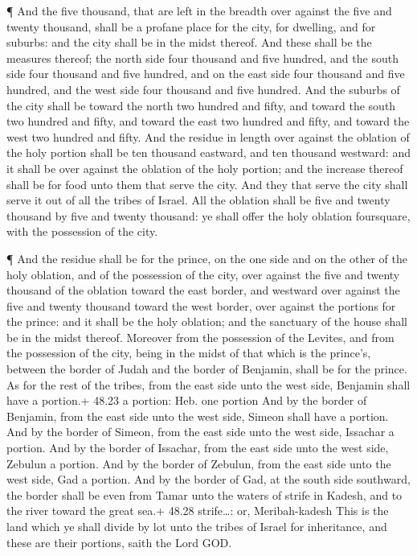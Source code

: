  ¶ And the five thousand, that are left in the breadth over
against the five and twenty thousand, shall be a profane place for the
city, for dwelling, and for suburbs: and the city shall be in the midst
thereof.  And these shall be the measures thereof; the
north side four thousand and five hundred, and the south side four
thousand and five hundred, and on the east side four thousand and five
hundred, and the west side four thousand and five hundred. 
And the suburbs of the city shall be toward the north two hundred and
fifty, and toward the south two hundred and fifty, and toward the east
two hundred and fifty, and toward the west two hundred and fifty.
 And the residue in length over against the oblation of the
holy portion shall be ten thousand eastward, and ten thousand westward:
and it shall be over against the oblation of the holy portion; and the
increase thereof shall be for food unto them that serve the city.
 And they that serve the city shall serve it out of all the
tribes of Israel.  All the oblation shall be five and
twenty thousand by five and twenty thousand: ye shall offer the holy
oblation foursquare, with the possession of the city.

 ¶ And the residue shall be for the prince, on the one side
and on the other of the holy oblation, and of the possession of the
city, over against the five and twenty thousand of the oblation toward
the east border, and westward over against the five and twenty thousand
toward the west border, over against the portions for the prince: and it
shall be the holy oblation; and the sanctuary of the house shall be in
the midst thereof.  Moreover from the possession of the
Levites, and from the possession of the city, being in the midst of that
which is the prince's, between the border of Judah and the border of
Benjamin, shall be for the prince.  As for the rest of the
tribes, from the east side unto the west side, Benjamin shall have a
portion.+ 48.23 a portion: Heb. one portion  And by the
border of Benjamin, from the east side unto the west side, Simeon shall
have a portion.  And by the border of Simeon, from the east
side unto the west side, Issachar a portion.  And by the
border of Issachar, from the east side unto the west side, Zebulun a
portion.  And by the border of Zebulun, from the east side
unto the west side, Gad a portion.  And by the border of
Gad, at the south side southward, the border shall be even from Tamar
unto the waters of strife in Kadesh, and to the river toward the great
sea.+ 48.28 strife\ldots: or, Meribah-kadesh  This is the
land which ye shall divide by lot unto the tribes of Israel for
inheritance, and these are their portions, saith the Lord GOD.

